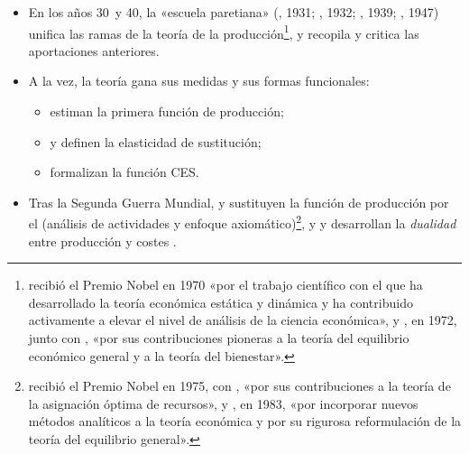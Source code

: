 \documentclass[11pt]{article}
\begin{document}
\begin{itemize}
\begin{itemize}
\begin{itemize}
  \item En los años 30~y 40, la «escuela paretiana» (, 1931; , 1932; , 1939; , 1947) unifica las ramas de la teoría de la producción\nocite{Viner1931Cost,Hotelling1932Edgeworth,Hicks1939Value,Samuelson1947Foundations}\footnote{ recibió el Premio Nobel en 1970 «por el trabajo científico con el que ha desarrollado la teoría económica estática y dinámica y ha contribuido activamente a elevar el nivel de análisis de la ciencia económica»\nocite{Nobel1970Samuelson}, y , en 1972, junto con , «por sus contribuciones pioneras a la teoría del equilibrio económico general y a la teoría del bienestar»\nocite{Nobel1972HicksArrow}.}, y \textcite{Stigler1941Production} recopila y critica las aportaciones anteriores.
  \item A la vez, la teoría gana sus medidas y sus formas funcionales:
    \begin{itemize}
    \item \textcite{CobbDouglas1928Theory} estiman la primera función de producción;
    \item \textcite{Hicks1932Theory} y \textcite{Robinson1933Economics} definen la elasticidad de sustitución;
    \item \textcite{ArrowEtAl1961Capital} formalizan la función CES.
    \end{itemize}
  \item Tras la Segunda Guerra Mundial, \textcite{Koopmans1951Activity} y \textcite{Debreu1959Theory} sustituyen la función de producción por el  (análisis de actividades y enfoque axiomático)\footnote{ recibió el Premio Nobel en 1975, con , «por sus contribuciones a la teoría de la asignación óptima de recursos»\nocite{NobelPrize1975Koopmans}, y , en 1983, «por incorporar nuevos métodos analíticos a la teoría económica y por su rigurosa reformulación de la teoría del equilibrio general»\nocite{Nobel1983Debreu}.}, y \textcite{Shephard1953Cost} y \textcite{Uzawa1964Duality} desarrollan la \emph{dualidad} entre producción y costes .
  \end{itemize}
  \end{itemize}


\end{itemize}
\end{document}
